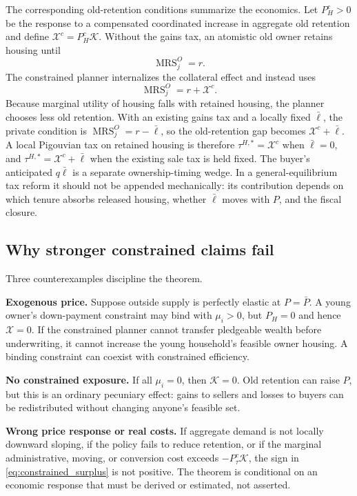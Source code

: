 \documentclass[11pt]{article}
\newcommand{\1}{\mathbf 1}
\newcommand{\MRS}{\operatorname{MRS}}
\newcommand{\ellbar}{\bar\ell}
\begin{document}
The corresponding old-retention conditions summarize the economics. Let
$P_H^c>0$ be the response to a compensated coordinated increase in aggregate
old retention and define $\mathcal X^c=P_H^c\mathcal K$. Without
the gains tax, an atomistic old owner retains housing until
\begin{equation}
\MRS_j^O=r.
\label{eq:old_private_notax}
\end{equation}
The constrained planner internalizes the collateral effect and instead uses
\begin{equation}
\MRS_j^O=r+\mathcal X^c.
\label{eq:old_planner_constrained}
\end{equation}
Because marginal utility of housing falls with retained housing, the planner
chooses less old retention. With an existing gains tax and a locally fixed
$\ellbar$, the private condition is $\MRS_j^O=r-\ellbar$, so the old-retention
gap becomes $\mathcal X^c+\ellbar$. A local Pigouvian tax on retained housing
is therefore $\tau^{H,*}=\mathcal X^c$ when $\ellbar=0$, and
$\tau^{H,*}=\mathcal X^c+\ellbar$ when the existing sale tax is held fixed.
The buyer's anticipated $q\ellbar$ is a separate ownership-timing wedge. In a
general-equilibrium tax reform it should not be appended mechanically: its
contribution depends on which tenure absorbs released housing, whether
$\ellbar$ moves with $P$, and the fiscal closure.

\subsection{Why stronger constrained claims fail}

Three counterexamples discipline the theorem.

\textbf{Exogenous price.} Suppose outside supply is perfectly elastic at
$P=\bar P$. A young owner's down-payment constraint may bind with
$\mu_i>0$, but $P_H=0$ and hence $\mathcal X=0$. If the constrained planner
cannot transfer pledgeable wealth before underwriting, it cannot increase the
young household's feasible owner housing. A binding constraint can coexist
with constrained efficiency.

\textbf{No constrained exposure.} If all $\mu_i=0$, then $\mathcal K=0$.
Old retention can raise $P$, but this is an ordinary pecuniary effect: gains to
sellers and losses to buyers can be redistributed without changing anyone's
feasible set.

\textbf{Wrong price response or real costs.} If aggregate demand is not locally
downward sloping, if the policy fails to reduce retention, or if the marginal
administrative, moving, or conversion cost exceeds
$-P_\tau^c\mathcal K$, the sign in \eqref{eq:constrained_surplus} is not
positive. The theorem is conditional on an economic response that must be
derived or estimated, not asserted.
\end{document}
